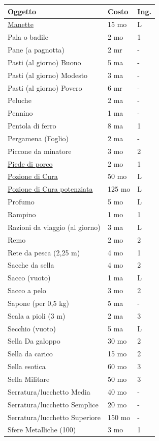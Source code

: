 \begin{multicols}{2}
\begin{tabular}{p{5.1cm}p{1.5cm}p{0.7cm}}
\toprule
\textbf{Oggetto} & \textbf{Costo} & \textbf{Ing.} \\
\toprule
\hyperlink{Manette}{Manette} & 15 mo & L \\
Pala o badile & 2 mo & 1 \\
Pane (a pagnotta) & 2 mr & - \\
Pasti (al giorno) Buono & 5 ma & - \\
Pasti (al giorno) Modesto & 3 ma & - \\
Pasti (al giorno) Povero & 6 mr & - \\
Peluche & 2 ma & - \\
Pennino & 1 ma & - \\
Pentola di ferro & 8 ma & 1 \\
Pergamena (Foglio) & 2 ma & - \\
Piccone da minatore & 3 mo & 2 \\
\hyperlink{piedediporco}{Piede di porco} & 2 mo & 1 \\
\hyperlink{Equip Pozione di Cura}{Pozione di Cura} & 50 mo & L \\
\hyperlink{Equip Pozione di Cura potenziata}{Pozione di Cura potenziata} & 125 mo & L \\
Profumo & 5 mo & L \\
Rampino & 1 mo & 1 \\
Razioni da viaggio (al giorno) & 3 ma & L \\
Remo & 2 mo & 2 \\
Rete da pesca (2,25 m) & 4 mo & 1 \\
Sacche da sella & 4 mo & 2 \\
Sacco (vuoto) & 1 ma & L \\
Sacco a pelo & 3 mo & 2 \\
Sapone (per 0,5 kg) & 5 ma & - \\
Scala a pioli (3 m) & 2 ma & 3 \\
Secchio (vuoto) & 5 ma & L \\
Sella Da galoppo & 30 mo & 2 \\
Sella da carico & 15 mo & 2 \\
Sella esotica & 60 mo & 3 \\
Sella Militare & 50 mo & 3 \\
Serratura/lucchetto Media & 40 mo & - \\
Serratura/lucchetto Semplice & 20 mo & - \\
Serratura/lucchetto Superiore & 150 mo & - \\
Sfere Metalliche (100) & 3 mo & 1 \\

\end{tabular}
\end{multicols}
